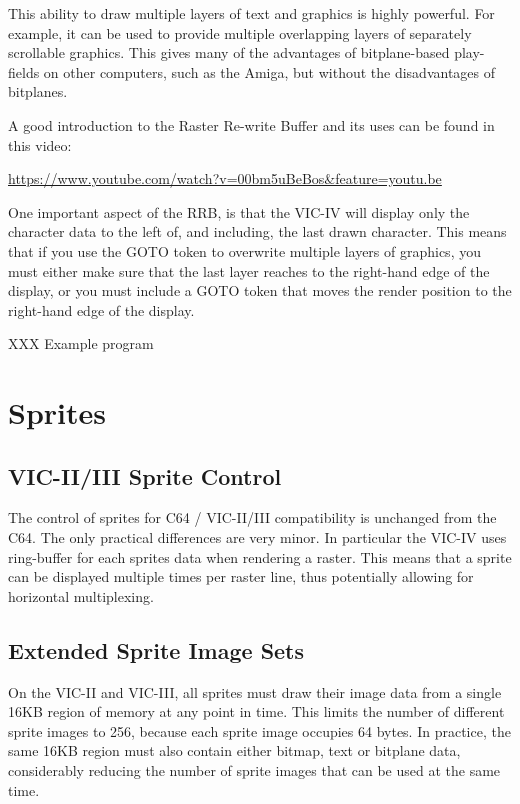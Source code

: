 This ability to draw multiple layers of text and graphics is highly powerful. For example, it can be used to provide multiple overlapping
layers of separately scrollable graphics.  This gives many of the advantages of bitplane-based play-fields on other computers, such as the
Amiga, but without the disadvantages of bitplanes.

A good introduction to the Raster Re-write Buffer and its uses can be found in this video:

\url{https://www.youtube.com/watch?v=00bm5uBeBos&feature=youtu.be}

One important aspect of the RRB, is that the VIC-IV will display only the character data to the left of, and including, the last drawn character.  This means that if you use the GOTO token to overwrite multiple layers of graphics, you must either make sure that the last layer
reaches to the right-hand edge of the display, or you must include a GOTO token that moves the render position to the right-hand edge of the display.


XXX Example program

\section{Sprites}

\subsection{VIC-II/III Sprite Control}

The control of sprites for C64 / VIC-II/III compatibility is unchanged from the C64.  The only practical differences are very minor.
In particular the VIC-IV uses ring-buffer for each sprites data when rendering a raster. This means that a sprite can be displayed multiple times per raster line, thus potentially allowing for horizontal multiplexing.

\subsection{Extended Sprite Image Sets}

On the VIC-II and VIC-III, all sprites must draw their image data from a single 16KB region of memory at any point in time.
This limits the number of different sprite images to 256, because each sprite image occupies 64 bytes.  In practice, the same
16KB region must also contain either bitmap, text or bitplane data, considerably reducing the number of sprite images that
can be used at the same time.

